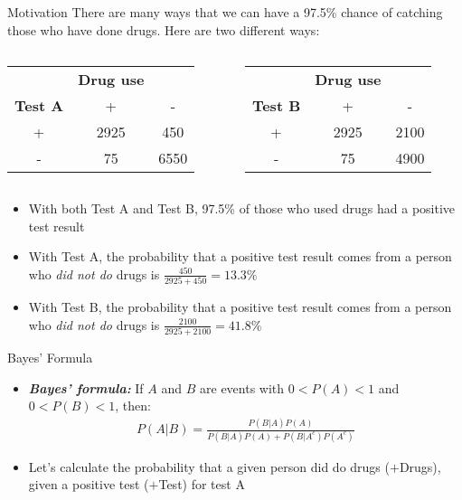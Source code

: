 \documentclass[xcolor=dvipsnames]{beamer}
\begin{document}
\begin{frame}{Motivation}
	There are many ways that we can have a 97.5\% chance of catching those who have done drugs. Here are two different ways:
	\vspace{10 pt}
	\begin{columns}
		\begin{column}{0.5 \textwidth}
			\begin{tabular}{c|cc}
				& \textbf{Drug use} & \\
				\textbf{Test A} & + & - \\ \hline
				+ & 2925 & 450 \\
				- & 75 & 6550\\
			\end{tabular}
		\end{column}
		\begin{column}{0.5 \textwidth}
			\begin{tabular}{c|cc}
				& \textbf{Drug use} & \\
				\textbf{Test B} & + & - \\ \hline
				+ & 2925 & 2100 \\
				- & 75 & 4900\\
			\end{tabular}
		\end{column}
	\end{columns}
	\vspace{10 pt}
	\begin{itemize}
		\item With both Test A and Test B, 97.5\% of those who used drugs had a positive test result
		\item With Test A, the probability that a positive test result comes from a person who \emph{did not do} drugs is $\frac{450}{2925 + 450} = 13.3\%$
		\item With Test B, the probability that a positive test result comes from a person who \emph{did not do} drugs is $\frac{2100}{2925 + 2100}=41.8\%$
	\end{itemize}
\end{frame}

\begin{frame}{Bayes' Formula}
	\begin{itemize}
		\item \emph{\textbf{Bayes' formula:}} If $A$ and $B$ are events with $0 < P(A) < 1$ and $0 < P(B) < 1$, then:
		\begin{gather*}
		P(A|B) = \frac{P(B|A) P(A)}{P(B|A) P(A) + P(B|A^c) P(A^c)}
		\end{gather*}
		\item Let's calculate the probability that a given person did do drugs ($+$Drugs), given a positive test ($+$Test) for test A
	\end{itemize}
\end{frame}
\end{document}
